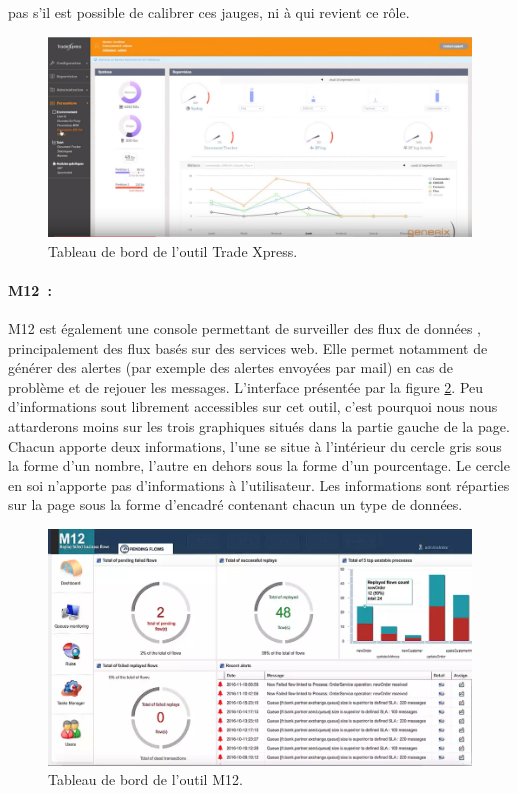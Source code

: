 			pas s’il est possible de calibrer ces jauges, ni à qui revient ce rôle.
			\begin{figure}[H]
				\centering
				\includegraphics[width=16cm]{../img/part2/trade_xpress.png}
				\caption{\label{trade_xpress} Tableau de bord de l'outil Trade Xpress.}
			\end{figure}
			
			\paragraph{M12~:}
			M12 est également une console permettant de surveiller des flux de données
			\citep{processmview_m12}, principalement des flux basés sur des services web.
			Elle permet notamment de générer des alertes (par exemple des alertes envoyées par mail) en cas de
			problème et de rejouer les messages.\newline
			L'interface présentée par la figure \ref{m12}. Peu d'informations sout
			librement accessibles sur cet outil, c'est pourquoi nous nous attarderons
			moins sur les trois graphiques situés dans la partie gauche de la page.
			Chacun apporte deux informations, l'une se situe à l'intérieur du cercle
			gris sous la forme d'un nombre, l'autre en dehors sous la forme d'un
			pourcentage. Le cercle en soi n'apporte pas d'informations à
			l'utilisateur.\newline
			Les informations sont réparties sur la page sous la
			forme d'encadré contenant chacun un type de données.
			\begin{figure}[H]
				\centering
				\includegraphics[width=16cm]{../img/part2/m12.png}
				\caption{\label{m12} Tableau de bord de l'outil M12.}
			\end{figure}
			
